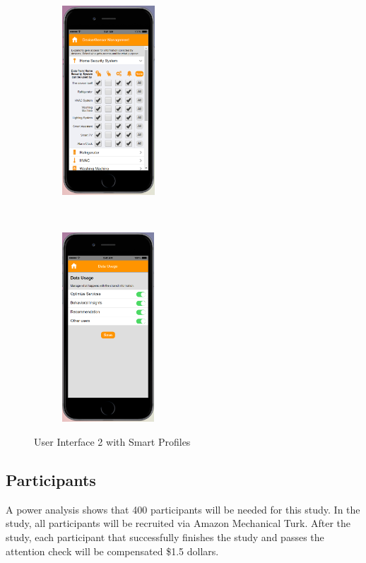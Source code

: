 \begin{figure}[htb]
\begin{subfigure}[t]{0.2\textwidth}
	\end{subfigure}%
	~~~~~
	\begin{subfigure}[t]{0.2\textwidth}
		\centering
		\includegraphics[height=2.8in]{figures/ui2sp4.png}
	\end{subfigure}%
	~~~~~
	\begin{subfigure}[t]{0.2\textwidth}
		\centering
		\includegraphics[height=2.8in]{figures/ui2sp5.png}
	\end{subfigure}%
	\caption{User Interface 2 with Smart Profiles}
	\label{fig:ui2Profiles}
\end{figure}

\subsection{Participants}
A power analysis shows that 400 participants will be needed for this study. In the study, all participants will be recruited via Amazon Mechanical Turk. After the study, each participant that successfully finishes the study and passes the attention check will be compensated \$1.5 dollars.




